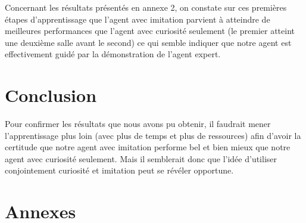 \documentclass[a4paper,12pt]{report}
\begin{document}
Concernant les résultats présentés en annexe 2, on constate sur ces premières étapes d'apprentissage que l'agent avec imitation parvient à atteindre de meilleures performances que l'agent avec curiosité seulement (le premier atteint une deuxième salle avant le second) ce qui semble indiquer que notre agent est effectivement guidé par la démonstration de l'agent expert.

\section*{Conclusion}
Pour confirmer les résultats que nous avons pu obtenir, il faudrait mener l'apprentissage plus loin (avec plus de temps et plus de ressources) afin d'avoir la certitude que notre agent avec imitation performe bel et bien mieux que notre agent avec curiosité seulement. Mais il semblerait donc que l'idée d'utiliser conjointement curiosité et imitation peut se révéler opportune.

\newpage
\section*{Annexes}
\end{document}
